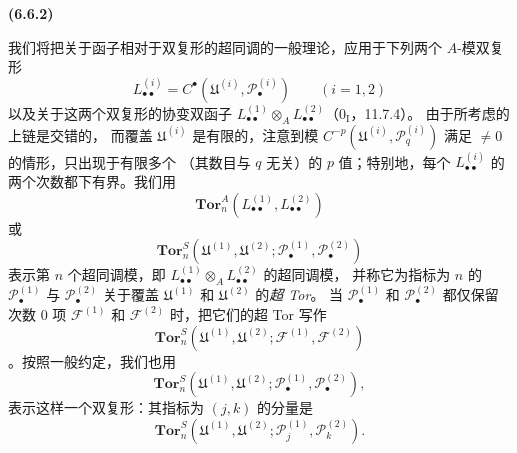 \documentclass[UTF8,fontset=none,11pt,oneside,openany]{ctexbook}
\newenvironment{env}[1][]{%
  \par\medskip\noindent\textbf{(#1)}\ %
}{\par}
\begin{document}
\begin{env}[6.6.2]
我们将把关于函子相对于双复形的超同调的一般理论，应用于下列两个 $A$-模双复形
\[
  L_{\bullet\bullet}^{(i)}
  =C^\bullet(\mathfrak U^{(i)},\mathscr P_\bullet^{(i)})
  \qquad(i=1,2)
\]
以及关于这两个双复形的协变双函子
$L_{\bullet\bullet}^{(1)}\otimes_A L_{\bullet\bullet}^{(2)}$（$0_{\mathrm I}$，11.7.4）。
由于所考虑的上链是交错的，
而覆盖 $\mathfrak U^{(i)}$ 是有限的，注意到模
$C^{-p}(\mathfrak U^{(i)},\mathscr P_q^{(i)})$ 满足 $\ne0$ 的情形，只出现于有限多个
（其数目与 $q$ 无关）的 $p$ 值；特别地，每个
$L_{\bullet\bullet}^{(i)}$ 的两个次数都下有界。我们用
\[
  \mathbf{Tor}_n^A(L_{\bullet\bullet}^{(1)},L_{\bullet\bullet}^{(2)})
\]
或
\[
  \mathbf{Tor}_n^S
  (\mathfrak U^{(1)},\mathfrak U^{(2)};
   \mathscr P_\bullet^{(1)},\mathscr P_\bullet^{(2)})
\]
表示第 $n$ 个超同调模，即
$L_{\bullet\bullet}^{(1)}\otimes_A L_{\bullet\bullet}^{(2)}$ 的超同调模，
并称它为指标为 $n$ 的 $\mathscr P_\bullet^{(1)}$ 与 $\mathscr P_\bullet^{(2)}$ 关于覆盖
$\mathfrak U^{(1)}$ 和 $\mathfrak U^{(2)}$ 的\emph{超 Tor}。
当 $\mathscr P_\bullet^{(1)}$ 和 $\mathscr P_\bullet^{(2)}$ 都仅保留次数 0 项
$\mathscr F^{(1)}$ 和 $\mathscr F^{(2)}$ 时，把它们的超 Tor 写作
\[
  \mathbf{Tor}_n^S
  (\mathfrak U^{(1)},\mathfrak U^{(2)};
   \mathscr F^{(1)},\mathscr F^{(2)})
\]
。按照一般约定，我们也用
\[
  \mathbf{Tor}_n^S
  (\mathfrak U^{(1)},\mathfrak U^{(2)};
   \mathscr P_\bullet^{(1)},\mathscr P_\bullet^{(2)}),
\]
表示这样一个双复形：其指标为 $(j,k)$ 的分量是
\[
  \mathbf{Tor}_n^S
  (\mathfrak U^{(1)},\mathfrak U^{(2)};
   \mathscr P_j^{(1)},\mathscr P_k^{(2)}).
\]


\end{env}
\end{document}

